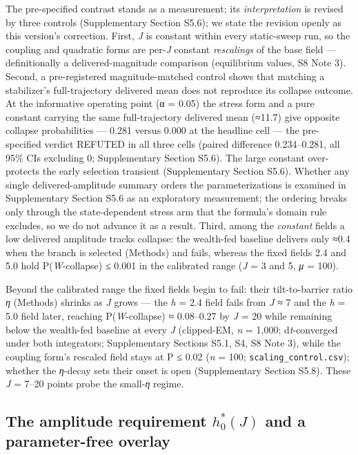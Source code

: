 \documentclass[11pt,letterpaper]{article}
\begin{document}
The pre-specified contrast stands as a measurement; its \emph{interpretation} is revised by three controls (Supplementary Section S5.6); we state the revision openly as this version's correction. First, \emph{J} is constant within every static-sweep run, so the coupling and quadratic forms are per-\emph{J} constant \emph{rescalings} of the base field --- definitionally a delivered-magnitude comparison (equilibrium values, S8 Note 3). Second, a pre-registered magnitude-matched control shows that matching a stabilizer's full-trajectory delivered mean does not reproduce its collapse outcome. At the informative operating point (α = 0.05) the stress form and a pure constant carrying the same full-trajectory delivered mean (≈11.7) give opposite collapse probabilities --- 0.281 versus 0.000 at the headline cell --- the pre-specified verdict REFUTED in all three cells (paired difference 0.234--0.281, all 95\% CIs excluding 0; Supplementary Section S5.6). The large constant over-protects the early selection transient (Supplementary Section S5.6). Whether any single delivered-amplitude summary orders the parameterizations is examined in Supplementary Section S5.6 as an exploratory measurement; the ordering breaks only through the state-dependent stress arm that the formula's domain rule excludes, so we do not advance it as a result. Third, among the \emph{constant} fields a low delivered amplitude tracks collapse: the wealth-fed baseline delivers only ≈0.4 when the branch is selected (Methods) and fails, whereas the fixed fields 2.4 and 5.0 hold P(\emph{W}-collapse) ≤ 0.001 in the calibrated range (\emph{J} = 3 and 5, \emph{μ} = 100).

Beyond the calibrated range the fixed fields begin to fail: their tilt-to-barrier ratio \emph{η} (Methods) shrinks as \emph{J} grows --- the \emph{h} = 2.4 field fails from \emph{J} ≈ 7 and the \emph{h} = 5.0 field later, reaching P(\emph{W}-collapse) ≈ 0.08--0.27 by \emph{J} = 20 while remaining below the wealth-fed baseline at every \emph{J} (clipped-EM, \emph{n} = 1,000; d\emph{t}-converged under both integrators; Supplementary Sections S5.1, S4, S8 Note 3), while the coupling form's rescaled field stays at P ≤ 0.02 (\emph{n} = 100; \texttt{scaling\_control.csv}); whether the \emph{η}-decay sets their onset is open (Supplementary Section S5.8). These \emph{J} = 7--20 points probe the small-\emph{η} regime.

\subsection{\texorpdfstring{The amplitude requirement \(h_0^*(J)\) and a parameter-free overlay}{The amplitude requirement h\_0\^{}*(J) and a parameter-free overlay}}\label{the-amplitude-requirement-h_0j-and-a-parameter-free-overlay}
\end{document}
